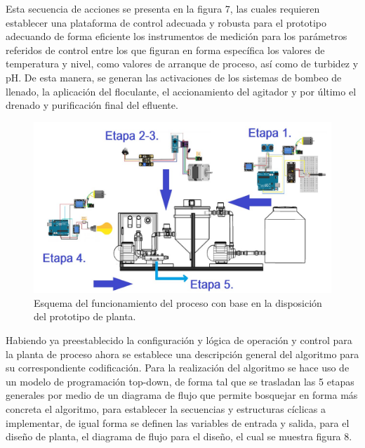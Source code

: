 \documentclass[conference]{IEEEtran}
\begin{document}
	Esta secuencia de acciones se presenta en la figura 7, las cuales requieren establecer una plataforma de control adecuada y robusta para el prototipo adecuando de forma eficiente los instrumentos de medición para los parámetros referidos de control entre los que figuran en forma específica los valores de temperatura y nivel, como valores de arranque de proceso, así como de turbidez y pH. De esta manera, se generan las activaciones de los sistemas de bombeo de llenado, la aplicación del floculante, el accionamiento del agitador y por último el drenado y purificación final del efluente.
	
	\begin{figure}[htbp]
		\centering
		\includegraphics[width=\columnwidth]{fig7.jpg}
		\caption{Esquema del funcionamiento del proceso con base en la disposición del prototipo de planta.}
		\label{fig:secuencia-acciones}
	\end{figure}
	
	Habiendo ya preestablecido la configuración y lógica de operación y control para la planta de proceso ahora se establece una descripción general del algoritmo para su correspondiente codificación. Para la realización del algoritmo se hace uso de un modelo de programación top-down, de forma tal que se trasladan las 5 etapas generales por medio de un diagrama de flujo que permite bosquejar en forma más concreta el algoritmo, para establecer la secuencias y estructuras cíclicas a implementar, de igual forma se definen las variables de entrada y salida, para el diseño de planta, el diagrama de flujo para el diseño, el cual se muestra figura 8.
	
\end{document}

